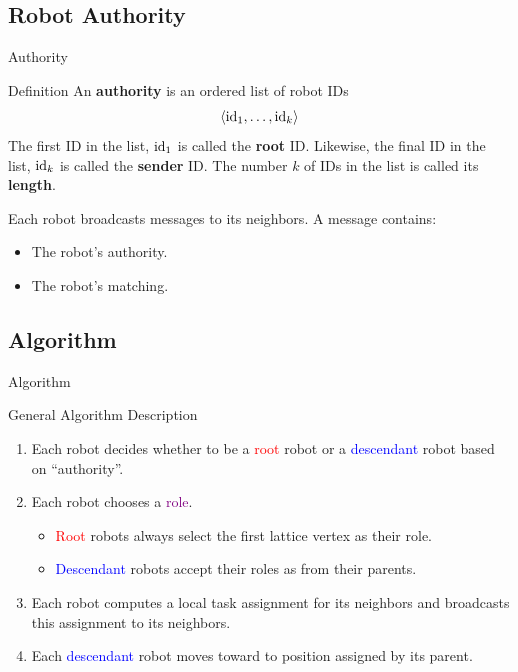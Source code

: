 \documentclass[10pt]{beamer}
\newcommand{\id}{{\rm id}}
\begin{document}
\subsection{Robot Authority}
\begin{frame}{Authority}
  \begin{block}{}
    \begin{bclogo}[couleur=orange!10, arrondi=0.2, ombre=true]{Definition} 
      An \textbf{authority} is an ordered list of robot IDs
      $$ \langle \id_1, \ldots, \id_k \rangle $$
      The first ID in the list, $\id_1$ is called the \textbf{root} ID.
      Likewise, the final ID in the list, $\id_k$ is called the
      \textbf{sender} ID.  The number $k$ of IDs in the list is called
      its \textbf{length}.
    \end{bclogo}
  \end{block}
  \begin{block}{Each robot broadcasts messages to its neighbors.}
    A message contains:\\
  \begin{itemize}
    \item The robot's authority.
    \item The robot's matching.
  \end{itemize}
  \end{block}
\end{frame}

\subsection{Algorithm}
\begin{frame}{Algorithm}
  \begin{block}{General Algorithm Description}
    \begin{enumerate}
    \item<1-> Each robot decides whether to be a \textcolor{red}{root}
      robot or a \textcolor{blue}{descendant} robot based on ``authority''.
      
    \item<2-> Each robot chooses a \textcolor{purple}{role}. 
      \begin{itemize}
      \item \textcolor{red}{Root} robots always select the
        first lattice vertex as their role.  
      \item \textcolor{blue}{Descendant} robots accept
        their roles as from their parents.
      \end{itemize}    
      
    \item<3-> Each robot computes a local task assignment for
      its neighbors and broadcasts this assignment to its neighbors.
      
    \item<4-> Each \textcolor{blue}{descendant} robot moves toward to
      position assigned by its parent.
    \end{enumerate}
  \end{block}
\end{frame}
\end{document}
